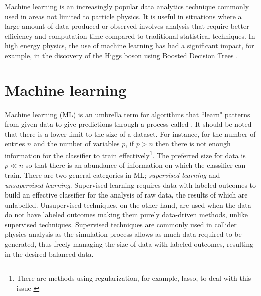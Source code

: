 Machine learning is an increasingly popular data analytics technique commonly used in areas not limited to particle physics. It is useful in situations where a large amount of data produced or observed involves analysis that require better efficiency and computation time compared to traditional statistical techniques. In high energy physics, the use of machine learning has had a significant impact, for example, in the discovery of the Higgs boson using Boosted Decision Trees \cite{chatrchyan2012observation, aad2012observation, chen2015higgs}. \\


\section{Machine learning}
Machine learning  (ML) is an umbrella term for algorithms that ``learn" patterns from given data to give predictions through a process called . It should be noted that there is a lower limit to the size of a dataset. For instance, for the number of entries $n$ and the number of variables $p$, if $p>n$ then there is not enough information for the classifier to train effectively\footnote{There are methods using regularization, for example, lasso, to deal with this issue \cite{james2013introduction}}. The preferred size for data is $p \ll n$ so that there is an abundance of information on which the classifier can train. There are two general categories in ML; \textit{supervised learning} and \textit{unsupervised learning}. Supervised learning requires data with labeled outcomes to build an effective classifier for the analysis of raw data, the results of which are unlabelled. Unsupervised techniques, on the other hand, are used when the data do not have labeled outcomes making them purely data-driven methods, unlike supervised techniques. Supervised techniques are commonly used in collider physics analysis as the simulation process allows as much data required to be generated, thus freely managing the size of data with labeled outcomes, resulting in the desired balanced data. \\


